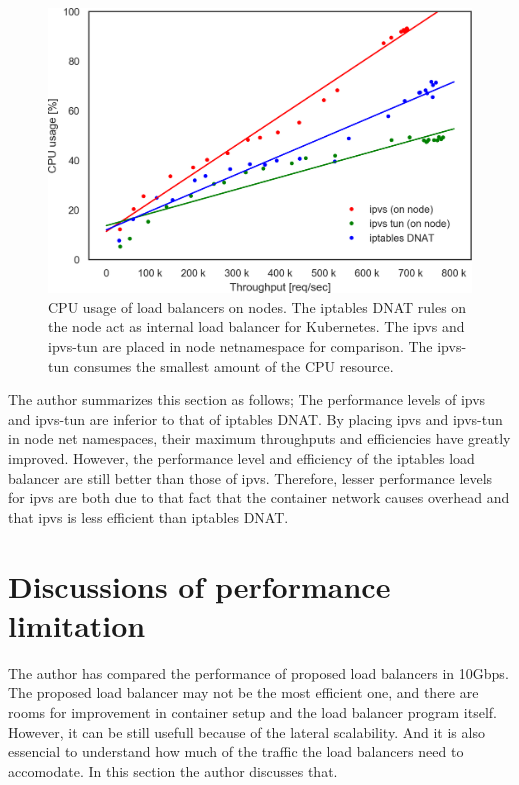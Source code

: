 \begin{figure}[h]
  \centering
  \includegraphics[width=0.8\columnwidth]{Figs/cpu_usage_10g_node_ns}
  \par\bigskip
  \centering
  \begin{minipage}{0.9\columnwidth}
    \caption[CPU usage of load balancers on nodes]{
      CPU usage of load balancers on nodes.
      The iptables DNAT rules on the node act as internal load balancer for Kubernetes.
      The ipvs and ipvs-tun are placed in node netnamespace for comparison. 
      The ipvs-tun consumes the smallest amount of the CPU resource.
    }
    \label{fig:cpu_usage_10g_node_ns}
  \end{minipage}
\end{figure}

The author summarizes this section as follows;
The performance levels of ipvs and ipvs-tun are inferior to that of iptables DNAT.
By placing ipvs and ipvs-tun in node net namespaces, their maximum throughputs and efficiencies have greatly improved.
However, the performance level and efficiency of the iptables load balancer are still better than those of ipvs.
Therefore, lesser performance levels for ipvs are both due to that fact that the container network causes overhead and that ipvs is less efficient than iptables DNAT.

\FloatBarrier

\section{Discussions of performance limitation}

The author has compared the performance of proposed load balancers in 10Gbps.
The proposed load balancer may not be the most efficient one, and there are rooms for improvement in container setup and the load balancer program itself.
However, it can be still usefull because of the lateral scalability.
And it is also essencial to understand how much of the traffic the load balancers need to accomodate.
In this section the author discusses that.

